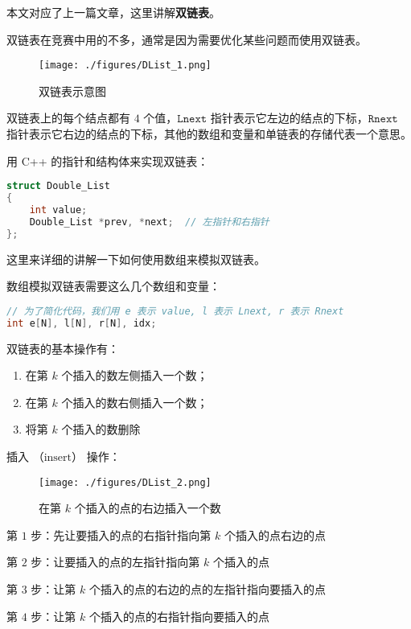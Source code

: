 
本文对应了上一篇文章，这里讲解\textbf{双链表}。

双链表在竞赛中用的不多，通常是因为需要优化某些问题而使用双链表。

\begin{figure}[ht]
\centering
\texttt{[image: ./figures/DList\_1.png]}
\caption{双链表示意图} \label{DList_fig1}
\end{figure}

双链表上的每个结点都有 $4$ 个值，$\mathtt{Lnext}$ 指针表示它左边的结点的下标，$\mathtt{Rnext}$ 指针表示它右边的结点的下标，其他的数组和变量和单链表的存储代表一个意思。

用 C++ 的指针和结构体来实现双链表：
\begin{lstlisting}[language=cpp]
struct Double_List
{
    int value;
    Double_List *prev, *next;  // 左指针和右指针
};
\end{lstlisting}

这里来详细的讲解一下如何使用数组来模拟双链表。

数组模拟双链表需要这么几个数组和变量：
\begin{lstlisting}[language=cpp]
// 为了简化代码，我们用 e 表示 value, l 表示 Lnext, r 表示 Rnext
int e[N], l[N], r[N], idx;
\end{lstlisting}

双链表的基本操作有：\begin{enumerate}
\item 在第 $k$ 个插入的数左侧插入一个数；
\item 在第 $k$ 个插入的数右侧插入一个数；
\item 将第 $k$ 个插入的数删除
\end{enumerate}

插入 （$\text{insert}$） 操作：

\begin{figure}[ht]
\centering
\texttt{[image: ./figures/DList\_2.png]}
\caption{在第 $k$ 个插入的点的右边插入一个数} \label{DList_fig2}
\end{figure}

第 $1$ 步：先让要插入的点的右指针指向第 $k$ 个插入的点右边的点

第 $2$ 步：让要插入的点的左指针指向第 $k$ 个插入的点

第 $3$ 步：让第 $k$ 个插入的点的右边的点的左指针指向要插入的点

第 $4$ 步：让第 $k$ 个插入的点的右指针指向要插入的点


